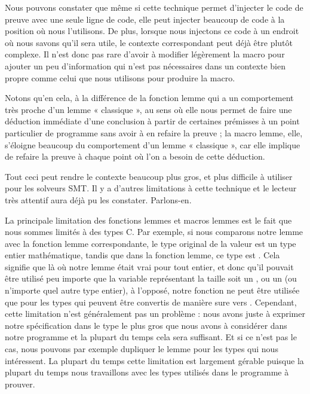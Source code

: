Nous pouvons constater que même si cette technique permet d'injecter le code de
preuve avec une seule ligne de code, elle peut injecter beaucoup de code à la
position où nous l'utilisons. De plus, lorsque nous injectons ce code à un endroit
où nous savons qu'il sera utile, le contexte correspondant peut déjà être plutôt
complexe. Il n'est donc pas rare d'avoir à modifier légèrement la macro pour
ajouter un peu d'information qui n'est pas nécessaires dans un contexte bien
propre comme celui que nous utilisons pour produire la macro.


Notons qu'en cela, à la différence de la fonction lemme qui a un comportement
très proche d'un lemme « classique », au sens où elle nous permet de faire une
déduction immédiate d'une conclusion à partir de certaines prémisses à un point
particulier de programme sans avoir à en refaire la preuve ; la macro lemme,
elle, s'éloigne beaucoup du comportement d'un lemme « classique », car elle
implique de refaire la preuve à chaque point où l'on a besoin de cette déduction.


Tout ceci peut rendre le contexte beaucoup plus gros, et plus difficile à utiliser
pour les solveurs SMT. Il y a d'autres limitations à cette technique et le lecteur
très attentif aura déjà pu les constater. Parlons-en.





La principale limitation des fonctions lemmes et macros lemmes
est le fait que nous sommes limités à des types C. Par exemple, si nous
comparons notre lemme  avec la
fonction lemme correspondante, le type original de la valeur
 est un type entier mathématique, tandis que dans la
fonction lemme, ce type est . Cela signifie que là
où notre lemme était vrai pour tout entier, et donc qu'il pouvait être utilisé
peu importe que la variable représentant la taille soit un ,
ou un  (ou n'importe quel autre type entier), à l'opposé,
notre fonction ne peut être utilisée que pour les types qui peuvent être
convertis de manière sure vers . Cependant, cette limitation
n'est généralement pas un problème : nous avons juste à exprimer notre
spécification dans le type le plus gros que nous avons à considérer dans notre
programme et la plupart du temps cela sera suffisant. Et si ce n'est pas le cas,
nous pouvons par exemple dupliquer le lemme pour les types qui nous intéressent.
La plupart du temps cette limitation est largement gérable puisque la plupart du
temps nous travaillons avec les types utilisés dans le programme à prouver.


